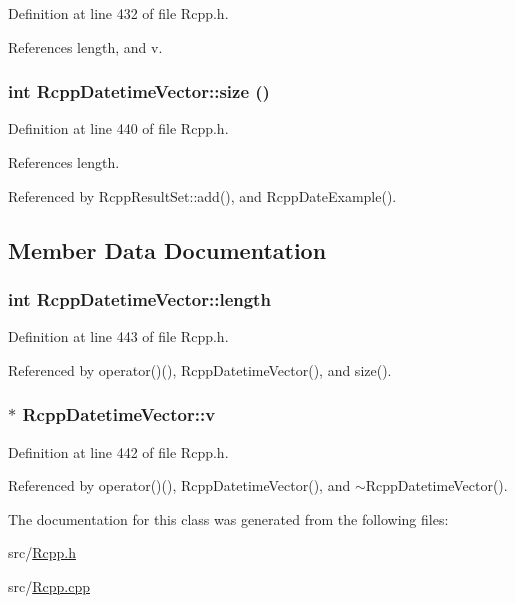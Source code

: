 Definition at line 432 of file Rcpp.h.

References length, and v.\hypertarget{classRcppDatetimeVector_a8ca7268098fb2b9250523c4e2ef3c8b7}{
\subsubsection[{size}]{\setlength{\rightskip}{0pt plus 5cm}int RcppDatetimeVector::size ()}}
\label{classRcppDatetimeVector_a8ca7268098fb2b9250523c4e2ef3c8b7}


Definition at line 440 of file Rcpp.h.

References length.

Referenced by RcppResultSet::add(), and RcppDateExample().

\subsection{Member Data Documentation}
\hypertarget{classRcppDatetimeVector_ae131031fcf2e65b7bfeee3d8e25c4f8c}{
\subsubsection[{length}]{\setlength{\rightskip}{0pt plus 5cm}int {\bf RcppDatetimeVector::length}}}
\label{classRcppDatetimeVector_ae131031fcf2e65b7bfeee3d8e25c4f8c}


Definition at line 443 of file Rcpp.h.

Referenced by operator()(), RcppDatetimeVector(), and size().\hypertarget{classRcppDatetimeVector_a0138476000351892e9ec591b2c9ec02f}{
\subsubsection[{v}]{$\ast$ {\bf RcppDatetimeVector::v}}}
\label{classRcppDatetimeVector_a0138476000351892e9ec591b2c9ec02f}


Definition at line 442 of file Rcpp.h.

Referenced by operator()(), RcppDatetimeVector(), and $\sim$RcppDatetimeVector().

The documentation for this class was generated from the following files:\begin{DoxyCompactItemize}
\item 
src/\hyperlink{Rcpp_8h}{Rcpp.h}\item 
src/\hyperlink{Rcpp_8cpp}{Rcpp.cpp}\end{DoxyCompactItemize}
